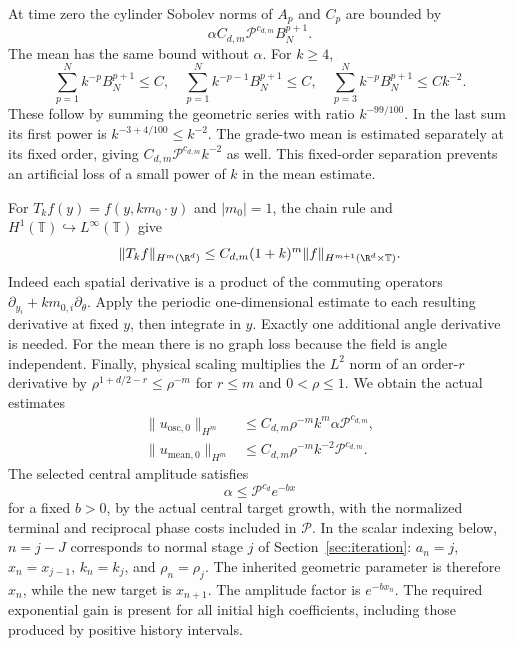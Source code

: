 At time zero the cylinder Sobolev norms of $A_p$ and $C_p$ are bounded by
\[ \alpha C_{d,m}\mathcal P^{c_{d,m}}B_N^{p+1}. \]
The mean has the same bound without $\alpha$. For $k\ge4$,
\[
 \sum_{p=1}^{N}k^{-p}B_N^{p+1}\le C,
 \quad
 \sum_{p=1}^{N}k^{-p-1}B_N^{p+1}\le C,
 \quad
 \sum_{p=3}^{N}k^{-p}B_N^{p+1}\le Ck^{-2}.
\]
These follow by summing the geometric series with ratio $k^{-99/100}$.
In the last sum its first power is $k^{-3+4/100}\le k^{-2}$.
The grade-two mean is estimated separately at its fixed order, giving
$C_{d,m}\mathcal P^{c_{d,m}}k^{-2}$ as well. This fixed-order separation prevents
an artificial loss of a small power of $k$ in the mean estimate.

For $T_kf(y)=f(y,km_0\cdot y)$ and $|m_0|=1$, the chain rule and
$H^1(\mathbb T)\hookrightarrow L^\infty(\mathbb T)$ give
\[
 \|T_kf\|_{H^m(\R^d)}
       \le C_{d,m}(1+k)^m
                    \|f\|_{H^{m+1}(\R^d\times\mathbb T)}.
\]
Indeed each spatial derivative is a product of the commuting operators
$\partial_{y_i}+km_{0,i}\partial_\theta$. Apply the periodic one-dimensional
estimate to each resulting derivative at fixed $y$, then integrate in $y$.
Exactly one additional angle derivative is needed. For the mean there is
no graph loss because the field is angle independent.
Finally, physical scaling multiplies the $L^2$ norm of an order-$r$
derivative by $\rho^{1+d/2-r}\le\rho^{-m}$ for $r\le m$ and
$0<\rho\le1$. We obtain the actual estimates
\begin{align}
 \|u_{\mathrm{osc},0}\|_{H^m}
 &\le C_{d,m}\rho^{-m}k^m\alpha \mathcal P^{c_{d,m}},\label{eq:joined-initial-high}\\
 \|u_{\mathrm{mean},0}\|_{H^m}
 &\le C_{d,m}\rho^{-m}k^{-2}\mathcal P^{c_{d,m}}.
 \label{eq:joined-initial-mean}
\end{align}
The selected central amplitude satisfies
\[
 \alpha\le \mathcal P^{c_d}e^{-b x}
\]
for a fixed $b>0$, by the actual central target growth, with
the normalized terminal and reciprocal phase costs included in $\mathcal P$.
In the scalar indexing below, $n=j-J$ corresponds to normal stage $j$
of Section~\ref{sec:iteration}: $a_n=j$, $x_n=x_{j-1}$,
$k_n=k_j$, and $\rho_n=\rho_j$. The inherited geometric parameter
is therefore $x_n$, while the new target is $x_{n+1}$. The amplitude
factor is $e^{-b x_n}$. The required exponential gain is present for
all initial high coefficients, including those produced by positive
history intervals.

